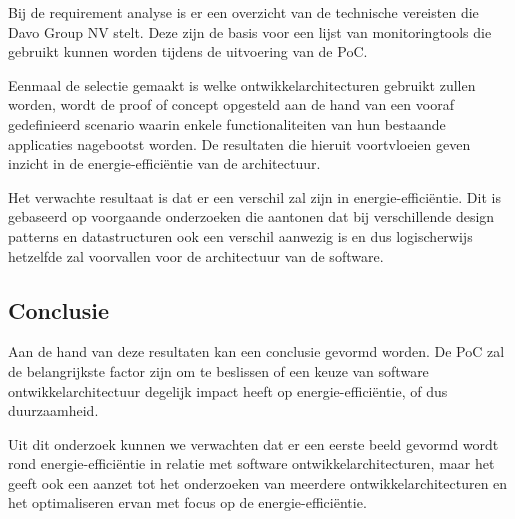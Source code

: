 Bij de requirement analyse is er een overzicht van de technische vereisten die Davo Group NV stelt. Deze zijn de basis voor een lijst van monitoringtools die gebruikt kunnen worden tijdens de uitvoering van de PoC.


Eenmaal de selectie gemaakt is welke ontwikkelarchitecturen gebruikt zullen worden, wordt de proof of concept opgesteld aan de hand van een vooraf gedefinieerd scenario waarin enkele functionaliteiten van hun bestaande applicaties nagebootst worden. De resultaten die hieruit voortvloeien geven inzicht in de energie-efficiëntie van de architectuur.

Het verwachte resultaat is dat er een verschil zal zijn in energie-efficiëntie. Dit is gebaseerd op voorgaande onderzoeken die aantonen dat bij verschillende design patterns en datastructuren ook een verschil aanwezig is en dus logischerwijs hetzelfde zal voorvallen voor de architectuur van de software.

\subsection{Conclusie}
Aan de hand van deze resultaten kan een conclusie gevormd worden. De PoC zal de belangrijkste factor zijn om te beslissen of een keuze van software ontwikkelarchitectuur degelijk impact heeft op energie-efficiëntie, of dus duurzaamheid.

Uit dit onderzoek kunnen we verwachten dat er een eerste beeld gevormd wordt rond energie-efficiëntie in relatie met software ontwikkelarchitecturen, maar het geeft ook een aanzet tot het onderzoeken van meerdere ontwikkelarchitecturen en het optimaliseren ervan met focus op de energie-efficiëntie.
%
%

